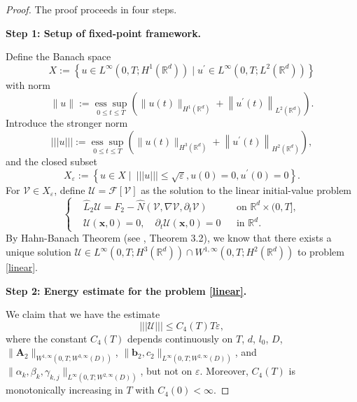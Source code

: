 \documentclass[11pt,reqno,oneside]{amsart}
\numberwithin{equation}{section}
\theoremstyle{definition}
\theoremstyle{remark}
\numberwithin{equation}{section}
\begin{document}
	\begin{proof}The proof proceeds in four steps.
		
		\medskip
		\textbf{Step 1: Setup of fixed-point framework.} 
		
		Define the Banach space
		$$
		X:=\left\{{u} \in L^{\infty}\left(0, T ; H^1\left(\mathbb{R}^d\right)\right) \mid {u}^{\prime} \in L^{\infty}\left(0, T ; L^2\left(\mathbb{R}^d\right)\right)\right\}
		$$
		with norm
		$$
		\|{u}\|:=\underset{0 \leq t \leq T}{\operatorname{ess} \sup }\left(\|{u}(t)\|_{H^1\left(\mathbb{R}^d\right)}+\left\|{u}^{\prime}(t)\right\|_{L^2\left(\mathbb{R}^d\right)}\right).
		$$
		Introduce the stronger norm 
		$$
		|||{u}|||:=\underset{0 \leq t \leq T}{\operatorname{ess} \sup }\left(\|{u}(t)\|_{H^3\left(\mathbb{R}^d\right)}+\left\|{u}^{\prime}(t)\right\|_{H^{2}\left(\mathbb{R}^d\right)}\right) ,
		$$
		and the closed subset
		$$
		X_\varepsilon:=\left\{{u} \in X \mid\ ||| {u}||| \leq \sqrt{\varepsilon},{u}(0)=0, {u}^{\prime}(0)=0\right\} .
		$$
		For \(\mathscr{V} \in X_\varepsilon\), define \(\mathscr{U} = \mathscr{F}[\mathscr{V}]\) as the solution to the linear initial-value problem
		\begin{equation}\label{linear}
			\left\{
			\begin{aligned}
				&\hat{L}_2 \mathscr{U}= F_2 -  \hat{N}(\mathscr{V}, \nabla \mathscr{V}, \partial_t \mathscr{V}) &&\text{on } \mathbb{R}^d \times (0,T], \\
				&\mathscr{U}(\mathbf{x},0) = 0, \quad \partial_t\mathscr{U}(\mathbf{x},0) = 0 && \text{in } \mathbb{R}^d.
			\end{aligned}
			\right.
		\end{equation}
		By Hahn-Banach Theorem  (see \cite{Sogge}, Theorem 3.2), we know that there exists a unique solution $\mathscr{U}\in L^{\infty}(0,T;H^{3}(\mathbb{R}^d))\cap W^{1,\infty}(0,T;H^{2}(\mathbb{R}^d))$ to problem \eqref{linear}.
		
		\medskip
		\textbf{Step 2: Energy estimate for the problem \eqref{linear}.}
		
		We claim that we have the estimate 
		\begin{equation}\label{key estimate}
			|||\mathscr{U}|||\leqslant C_4(T)T\varepsilon,
		\end{equation}
		where the constant \(C_4(T)\) depends continuously on \(T\), \(d\), \(l_0\), \(D\), \(\|\mathbf{A}_2\|_{W^{1,\infty}(0,T; W^{3,\infty}(D))}\), \(\|\mathbf{b}_2, c_2\|_{L^{\infty}(0,T; W^{2,\infty}(D))}\), and \(\|\alpha_k, \beta_k, \gamma_{k,j}\|_{L^{\infty}(0,T; W^{2,\infty}(D))}\), but not on \(\varepsilon\). Moreover, \(C_4(T)\) is monotonically increasing in \(T\) with \(C_4(0) < \infty\).
		

\end{proof}
\end{document}
